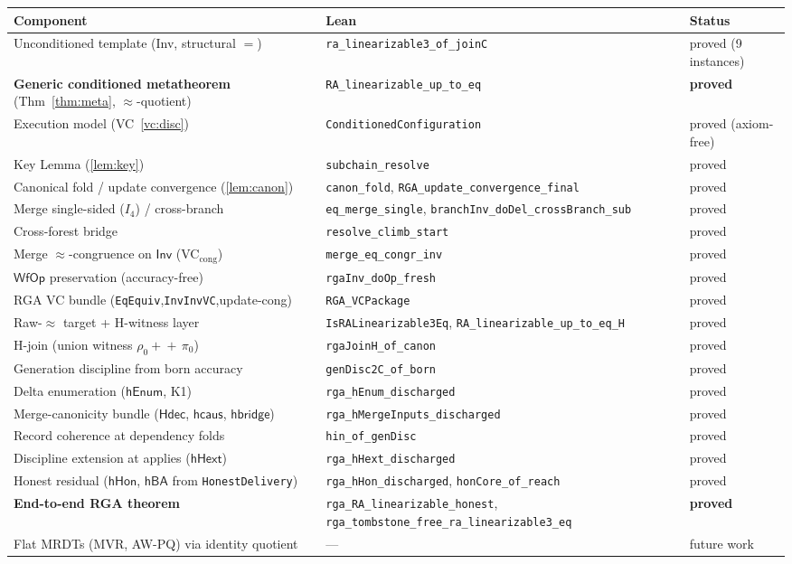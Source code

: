 \documentclass[11pt]{article}
\theoremstyle{definition}
\theoremstyle{remark}
\newcommand{\eqobs}{\approx}
\newcommand{\Inv}{\mathsf{Inv}}
\newcommand{\lean}[1]{\texttt{#1}}
\begin{document}
\begin{center}
\begin{tabular}{@{}p{}p{}p{}@{}}
\hline
Component & Lean & Status\\
\hline
Unconditioned template (Inv, structural $=$) & \lean{ra\_linearizable3\_of\_joinC} &
  proved (9 instances)\\
\textbf{Generic conditioned metatheorem} (Thm~\ref{thm:meta}, $\eqobs$-quotient) &
  \lean{RA\_linearizable\_up\_to\_eq} & \textbf{proved}\\
Execution model (VC~\ref{vc:disc}) & \lean{ConditionedConfiguration} & proved (axiom-free)\\
Key Lemma (\ref{lem:key}) & \lean{subchain\_resolve} & proved\\
Canonical fold / update convergence (\ref{lem:canon}) & \lean{canon\_fold},
  \lean{RGA\_update\_convergence\_final} & proved\\
Merge single-sided ($I_4$) / cross-branch & \lean{eq\_merge\_single},
  \lean{branchInv\_doDel\_crossBranch\_sub} & proved\\
Cross-forest bridge & \lean{resolve\_climb\_start} & proved\\
Merge $\eqobs$-congruence on $\Inv$ (VC$_{\mathrm{cong}}$) & \lean{merge\_eq\_congr\_inv} & proved\\
$\mathsf{WfOp}$ preservation (accuracy-free) & \lean{rgaInv\_doOp\_fresh} & proved\\
RGA VC bundle (\lean{EqEquiv},\lean{InvInvVC},update-cong) & \lean{RGA\_VCPackage} & proved\\
\hline
Raw-$\eqobs$ target + H-witness layer & \lean{IsRALinearizable3Eq},
  \lean{RA\_linearizable\_up\_to\_eq\_H} & proved\\
H-join (union witness $\rho_0 +\!\!+\, \pi_0$) & \lean{rgaJoinH\_of\_canon} & proved\\
Generation discipline from born accuracy & \lean{genDisc2C\_of\_born} & proved\\
Delta enumeration ($\mathsf{hEnum}$, K1) & \lean{rga\_hEnum\_discharged} & proved\\
Merge-canonicity bundle ($\mathsf{Hdec}$, $\mathsf{hcaus}$, $\mathsf{hbridge}$) &
  \lean{rga\_hMergeInputs\_discharged} & proved\\
Record coherence at dependency folds & \lean{hin\_of\_genDisc} & proved\\
Discipline extension at applies ($\mathsf{hHext}$) & \lean{rga\_hHext\_discharged} & proved\\
Honest residual ($\mathsf{hHon}$, $\mathsf{hBA}$ from \lean{HonestDelivery}) &
  \lean{rga\_hHon\_discharged}, \lean{honCore\_of\_reach} & proved\\
\textbf{End-to-end RGA theorem} & \lean{rga\_RA\_linearizable\_honest},
  \lean{rga\_tombstone\_free\_ra\_linearizable3\_eq} & \textbf{proved}\\
\hline
Flat MRDTs (MVR, AW-PQ) via identity quotient & --- & future work\\
\hline
\end{tabular}
\end{center}
\end{document}
